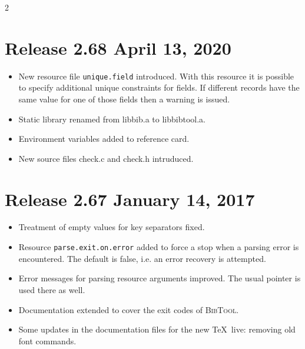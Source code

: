 \documentclass[11pt,a4paper]{scrartcl}
\newcommand\rsc[1]{\texttt{#1}}
\newcommand\File[1]{\textsf{#1}}
\newcommand\BibTool{\textsc{BibTool}}
\newenvironment{Releases}{\begin{multicols}2\RaggedRight}{\end{multicols}}
\newenvironment{Release}[2]{%
  \def\tmp{#2}%
  \section*{Release #1 \ifx\tmp\empty\else{\normalsize[#2]}\fi}
  \begin{itemize}
}{\end{itemize}}
\newenvironment{Fix}[1]{\item }{}
\newenvironment{New}[1]{\item }{}
\newenvironment{Update}[1]{\item }{}
\begin{document}
\begin{Releases}
\begin{Release}{2.68}{April 13, 2020}
\begin{New}{gene}
    New resource file \rsc{unique.field} introduced. With this
    resource it is possible to specify additional unique constraints
    for fields. If different records have the same value for one of
    those fields then a warning is issued.
  \end{New}
  \begin{Update}{gene}
    Static library renamed from \File{libbib.a} to \File{libbibtool.a}.
  \end{Update}
  \begin{Update}{gene}
    Environment variables added to reference card.
  \end{Update}
  \begin{New}{gene}
    New source files \File{check.c} and \File{check.h} intruduced.
  \end{New}
 \end{Release}

 \begin{Release}{2.67}{January 14, 2017}
  \begin{Fix}{gene}
    Treatment of empty values for key separators fixed.
  \end{Fix}
  \begin{New}{gene}
    Resource \rsc{parse.exit.on.error} added to force a stop when a parsing
    error is encountered. The default is false, i.e. an error recovery is
    attempted.
  \end{New}
  \begin{Update}{gene}
    Error messages for parsing resource arguments improved. The usual pointer
    is used there as well.
  \end{Update}
  \begin{Update}{gene}
    Documentation extended to cover the exit codes of \BibTool.
  \end{Update}
  \begin{Update}{gene}
    Some updates in the documentation files for the new \TeX\ live:
    removing old font commands.
  \end{Update}
 \end{Release}


\end{Releases}
\end{document}
